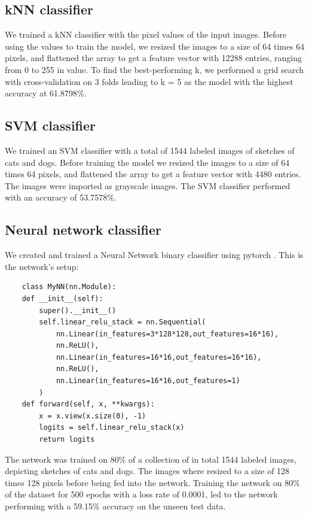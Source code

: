 \subsection*{kNN classifier}
We trained a kNN classifier with the pixel values of the input images. Before
using the values to train the model, we resized the images to a size of 64 times 
64 pixels, and flattened the array to get a feature vector with 12288 entries, 
ranging from 0 to 255 in value. To find the best-performing k, we performed a
grid search with cross-validation on 3 folds leading to k = 5 as the model with 
the highest accuracy at 61.8798\%.

\subsection*{SVM classifier}
We trained an SVM classifier with a total of 1544 labeled images of sketches of
cats and dogs. Before training the model we resized the images to a size of 64
times 64 pixels, and flattened the array to get a feature vector with 4480
entries. The images were imported as grayscale images. The SVM classifier
performed with an accuracy of 53.7578\%.


\subsection*{Neural network classifier}
We created and trained a Neural Network binary classifier using pytorch
\textcite{pytorch}. This is the network's setup:

\begin{lstlisting}
    class MyNN(nn.Module):
    def __init__(self):
        super().__init__()
        self.linear_relu_stack = nn.Sequential(
            nn.Linear(in_features=3*128*128,out_features=16*16),
            nn.ReLU(),
            nn.Linear(in_features=16*16,out_features=16*16),
            nn.ReLU(),
            nn.Linear(in_features=16*16,out_features=1)
        )
    def forward(self, x, **kwargs):
        x = x.view(x.size(0), -1)
        logits = self.linear_relu_stack(x)
        return logits
\end{lstlisting}

The network was trained on 80\% of a collection of in total 1544 labeled images,
depicting sketches of cats and dogs. The images where resized to a size of
128 times 128 pixels before being fed into the network. Training the network on
80\% of the dataset for 500 epochs with a loss rate of 0.0001, led to the
network performing with a 59.15\% accuracy on the unseen test data.

